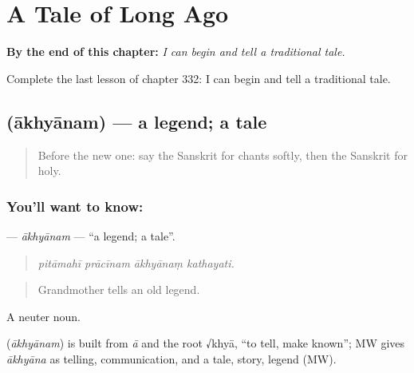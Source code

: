 
\chapter{A Tale of Long Ago}
\label{ch:sa-a-tale-of-long-ago}

\begin{chapteropening}
\textbf{By the end of this chapter:} \emph{I can begin and tell a traditional tale.}

Complete the last lesson of chapter 332: I can begin and tell a traditional tale.
\end{chapteropening}

\section[\texorpdfstring{\sk{आख्यानम्} (ākhyānam)}{आख्यानम् (ākhyānam)}]{ (ākhyānam) — a legend; a tale}

\label{lesson:SA-C332-akhyanam}



\begin{quote}
Before the new one: say the Sanskrit for chants softly, then the Sanskrit for holy.
\end{quote}

\subsection*{You'll want to know: }
\textbf{} — \emph{ākhyānam} — \textquotedblleft{}a legend; a tale\textquotedblright{}.

\begin{quote}
   
\end{quote}

\begin{quote}
\emph{pitāmahī prācīnam ākhyānaṃ kathayati.}
\end{quote}

\begin{quote}
Grandmother tells an old legend.
\end{quote}

A neuter noun.

\begin{cousinweb}
\textbf{} (\emph{ākhyānam}) is built from \emph{ā} and the root √khyā, \textquotedblleft{}to tell, make known\textquotedblright{}; MW gives \emph{ākhyāna} as telling, communication, and a tale, story, legend (MW).
\end{cousinweb}

